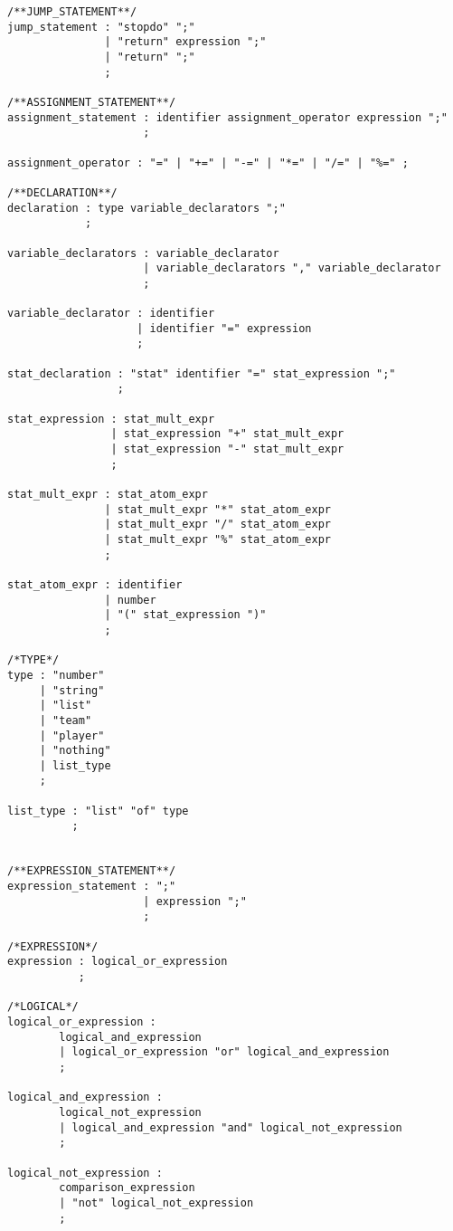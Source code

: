\begin{singlespacing}
\begin{verbatim}
/**JUMP_STATEMENT**/
jump_statement : "stopdo" ";"
               | "return" expression ";"
               | "return" ";"
               ;
              
/**ASSIGNMENT_STATEMENT**/ 
assignment_statement : identifier assignment_operator expression ";"
                     ;

assignment_operator : "=" | "+=" | "-=" | "*=" | "/=" | "%=" ;

/**DECLARATION**/
declaration : type variable_declarators ";"
            ;

variable_declarators : variable_declarator
                     | variable_declarators "," variable_declarator
                     ;

variable_declarator : identifier
                    | identifier "=" expression
                    ;

stat_declaration : "stat" identifier "=" stat_expression ";"
                 ;

stat_expression : stat_mult_expr
                | stat_expression "+" stat_mult_expr
                | stat_expression "-" stat_mult_expr
                ;

stat_mult_expr : stat_atom_expr
               | stat_mult_expr "*" stat_atom_expr
               | stat_mult_expr "/" stat_atom_expr
               | stat_mult_expr "%" stat_atom_expr
               ;

stat_atom_expr : identifier
               | number
               | "(" stat_expression ")"
               ;

/*TYPE*/
type : "number"
     | "string"
     | "list"
     | "team"
     | "player"
     | "nothing"
     | list_type
     ;

list_type : "list" "of" type
          ;


/**EXPRESSION_STATEMENT**/
expression_statement : ";"
                     | expression ";"
                     ;

/*EXPRESSION*/
expression : logical_or_expression
           ;

/*LOGICAL*/
logical_or_expression : 
        logical_and_expression
        | logical_or_expression "or" logical_and_expression
        ;

logical_and_expression : 
        logical_not_expression
        | logical_and_expression "and" logical_not_expression
        ;

logical_not_expression : 
        comparison_expression
        | "not" logical_not_expression
        ;


\end{verbatim}
\end{singlespacing}
